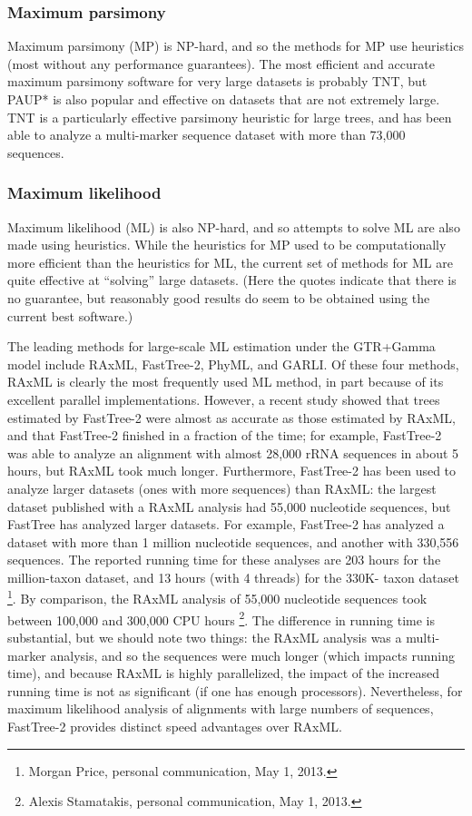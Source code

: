 \subsubsection{Maximum parsimony}
Maximum parsimony (MP) is NP-hard, and so the methods for 
MP use heuristics (most without any performance guarantees). 
The most efficient and accurate maximum parsimony software 
for very large datasets is probably TNT, but PAUP* is also 
popular and effective on datasets that are not extremely large. 
TNT is a particularly effective parsimony heuristic for 
large trees, and has been able to analyze a multi-marker 
sequence dataset with more than 73,000 sequences.

\subsubsection{Maximum likelihood}
Maximum likelihood (ML) is also NP-hard, and so attempts to 
solve ML are also made using heuristics. While the heuristics 
for MP used to be computationally more efficient than the 
heuristics for ML, the current set of methods for ML are 
quite effective at ``solving'' large datasets. (Here the 
quotes indicate that there is no guarantee, but reasonably 
good results do seem to be obtained using the current best software.)

The leading methods for large-scale ML estimation under the 
GTR+Gamma model include RAxML, FastTree-2, PhyML, and GARLI. 
Of these four methods, RAxML is clearly the most frequently 
used ML method, in part because of its excellent parallel 
implementations. However, a recent study showed that trees 
estimated by FastTree-2 were almost as accurate as those 
estimated by RAxML, and that FastTree-2 finished in a 
fraction of the time; for example, FastTree-2 was able to 
analyze an alignment with almost 28,000 rRNA sequences 
in about 5 hours, but RAxML took much longer. 
Furthermore, FastTree-2 has been used to analyze larger 
datasets (ones with more sequences) than RAxML: the 
largest dataset published with a RAxML analysis 
had 55,000 nucleotide sequences, but FastTree has 
analyzed larger datasets. For example, FastTree-2 
has analyzed a dataset with more than 1 million nucleotide 
sequences, and another with 330,556 sequences. 
The reported running time for these analyses are 203 
hours for the million-taxon dataset, and 13 hours 
(with 4 threads) for the 330K- taxon dataset 
\footnote{Morgan Price, personal communication, May 1, 2013.}. 
By comparison, the RAxML analysis of 55,000 nucleotide 
sequences took between 100,000 and 300,000 CPU hours
\footnote{Alexis Stamatakis, personal communication, May 1, 2013.}. 
The difference in running time is substantial, but we 
should note two things: the RAxML analysis was a 
multi-marker analysis, and so the sequences were much 
longer (which impacts running time), and because RAxML 
is highly parallelized, the impact of the increased running 
time is not as significant (if one has enough processors). 
Nevertheless, for maximum likelihood analysis of alignments 
with large numbers of sequences, FastTree-2 provides 
distinct speed advantages over RAxML.  


